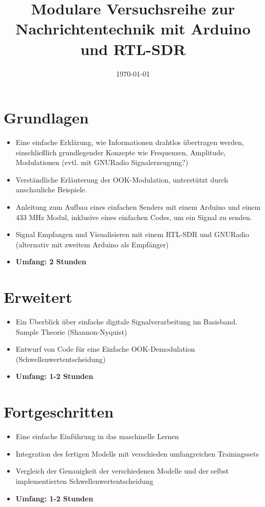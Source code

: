 \documentclass{article}
\title{Modulare Versuchsreihe zur Nachrichtentechnik mit Arduino und RTL-SDR}
\author{}
\date{\today}
\begin{document}
\maketitle

\section{Grundlagen}
\begin{itemize}
    \item Eine einfache Erklärung, wie Informationen drahtlos übertragen werden, einschließlich grundlegender Konzepte wie Frequenzen, Amplitude, Modulationen (evtl. mit GNURadio Signalerzeugung?)
    \item Verständliche Erläuterung der OOK-Modulation, unterstützt durch anschauliche Beispiele.
    \item Anleitung zum Aufbau eines einfachen Senders mit einem Arduino und einem 433 MHz Modul, inklusive eines einfachen Codes, um ein Signal zu senden.
    \item Signal Empfangen und Visualisieren mit einem RTL-SDR und GNURadio (alternativ mit zweitem Arduino als Empfänger)
    \item \textbf{Umfang: 2 Stunden}
\end{itemize}

\section{Erweitert}
\begin{itemize}
    \item Ein Überblick über einfache digitale Signalverarbeitung im Basisband. Sample Theorie (Shannon-Nyquist)
    \item Entwurf von Code für eine Einfache OOK-Demodulation (Schwellenwertentscheidung)
    \item \textbf{Umfang: 1-2 Stunden}
\end{itemize}

\section{Fortgeschritten}
\begin{itemize}
    \item Eine einfache Einführung in das maschinelle Lernen 
    \item Integration des fertigen Modells mit verschieden umfangreichen Trainingssets
    \item Vergleich der Genauigkeit der verschiedenen Modelle und der selbst implementierten Schwellenwertentscheidung
    \item \textbf{Umfang: 1-2 Stunden}
\end{itemize}
\end{document}
